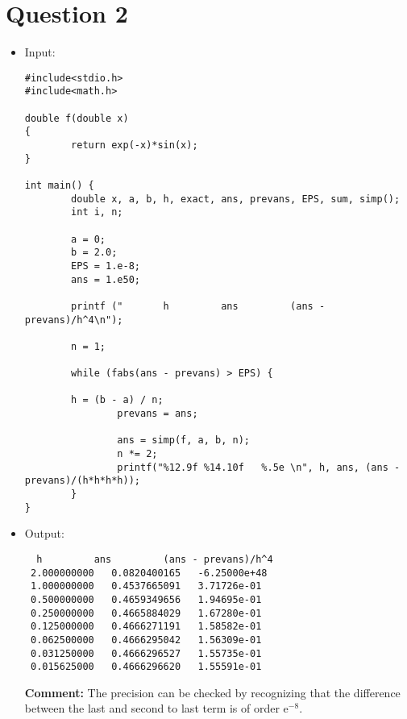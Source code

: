 \documentclass[10pt]{article}
\begin{document}
\section{Question 2}
\begin{itemize}
 \item Input:
\begin{verbatim}
#include<stdio.h>
#include<math.h>

double f(double x)
{
        return exp(-x)*sin(x);
}

int main() {
        double x, a, b, h, exact, ans, prevans, EPS, sum, simp();
        int i, n;

        a = 0;
        b = 2.0;
        EPS = 1.e-8;
        ans = 1.e50;

        printf ("       h         ans         (ans - prevans)/h^4\n");

        n = 1;

        while (fabs(ans - prevans) > EPS) {

        h = (b - a) / n;
                prevans = ans;

                ans = simp(f, a, b, n);
                n *= 2;
                printf("%12.9f %14.10f   %.5e \n", h, ans, (ans - prevans)/(h*h*h*h));
        }
}
\end{verbatim}
\item Output:
\begin{verbatim}
  h         ans         (ans - prevans)/h^4
 2.000000000   0.0820400165   -6.25000e+48 
 1.000000000   0.4537665091   3.71726e-01 
 0.500000000   0.4659349656   1.94695e-01 
 0.250000000   0.4665884029   1.67280e-01 
 0.125000000   0.4666271191   1.58582e-01 
 0.062500000   0.4666295042   1.56309e-01 
 0.031250000   0.4666296527   1.55735e-01 
 0.015625000   0.4666296620   1.55591e-01 
\end{verbatim}
\textbf{Comment:} The precision can be checked by recognizing that the difference between the last and second to last term is of order e$^{-8}$.
\end{itemize}

\end{document}
